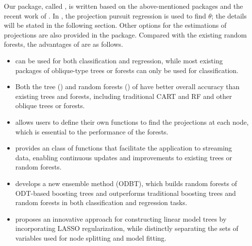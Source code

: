 Our package, called ,  is written based on the above-mentioned packages and the recent work of  \citet{zhan2022consistency}.
In , the projection pursuit regression \citep{friedman1981projection} is used to find $ \theta $; the details will be stated in the following section. Other options for the estimations of projections are also  provided in the package. 
Compared with the existing random forests, the advantages of  are as follows.
\begin{itemize}

	\item {} can be used for both classification and regression, while most existing packages of oblique-type trees or forests can only be used for classification.
	\item Both the tree () and random forests () of  have better overall accuracy than existing trees and forests, including traditional CART and RF and other oblique trees or forests.

	\item {} allows users to define their own functions to find the projections  at each node, which is essential to the performance of the forests.

	\item {} provides an  class of functions that facilitate the application to streaming data, enabling continuous updates and improvements to existing trees or random forests. 

    \item {} develops a new ensemble method (ODBT), 
    which builds random forests of ODT-based boosting trees and outperforms traditional boosting trees and random forests in both classification and regression tasks.

     \item {} proposes an innovative approach for constructing linear model trees by incorporating LASSO regularization, while distinctly separating the sets of variables used for node splitting and model fitting.

\end{itemize}

